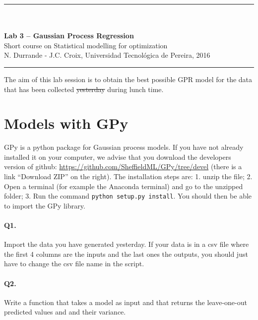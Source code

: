 \documentclass[12pt]{scrartcl}
\begin{document}
\begin{center}
	\rule{\textwidth}{1pt}
	\\ \ \\
	{\LARGE \textbf{Lab 3 -- Gaussian Process Regression}}\\ 
	\vspace{3mm}
	{\large Short course on Statistical modelling for optimization\\ \vspace{3mm}}
	{\normalsize N. Durrande - J.C. Croix, Universidad Tecnol\'ogica de Pereira, 2016}\\ 
	\vspace{3mm}
	\rule{\textwidth}{1pt}
	\vspace{5mm}
\end{center}
The aim of this lab session is to obtain the best possible GPR model for the data that has been collected \sout{yesterday} during lunch time.

\section{Models with GPy}
GPy is a python package for Gaussian process models. If you have not already installed it on your computer, we advise that you download the developers version of github:
\url{https://github.com/SheffieldML/GPy/tree/devel} (there is a link ``Download ZIP'' on the right). The installation steps are: 1. unzip the file; 2. Open a terminal (for example the Anaconda terminal) and go to the unzipped folder; 3. Run the command \texttt{python setup.py install}. You should then be able to import the GPy library.

\paragraph{Q1.} Import the data you have generated yesterday. If your data is in a csv file where the first 4 columns are the inputs and the last ones the outputs, you should just have to change the csv file name in the script.

\paragraph{Q2.} Write a function that takes a model as input and that returns the leave-one-out predicted values and and their variance. 
\end{document}
